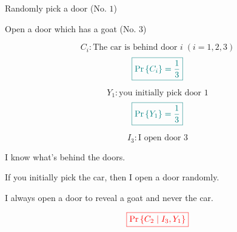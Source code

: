 
\begin{frame}{}
  \centerline{}

  \pause
  \vspace{-0.40cm}
  \begin{description}[(S)he]
    \centering
    \item[You:] Randomly pick a door (No. $1$)
    \item[I:] Open a door which has a goat (No. $3$) \\
  \end{description}

  \vspace{0.30cm}
  \centerline{}
\end{frame}

\begin{frame}{}
  \[
    C_i: \text{The car is behind door } i\; (i = 1, 2, 3)
  \]
  \[
    \textcolor{teal}{\boxed{\Pr\left\{C_i\right\} = \frac{1}{3}}}
  \]

  \pause
  \centerline{}

  \pause
  \vspace{0.50cm}
  \[
    Y_1: \text{you initially pick door } 1
  \]
  \[
    \textcolor{teal}{\boxed{\Pr\left\{Y_1\right\} = \frac{1}{3}}}
  \]

  \pause
  \centerline{}

\end{frame}

\begin{frame}{}
  \[
    I_3: \text{I open door } 3
  \]

  \vspace{0.50cm}
  \begin{description}
    \setlength{\itemsep}{8pt}
    \item<2->[\purple{\textsc{Assumption}:}]
      I know what's behind the doors.
    \item<3->[\purple{\textsc{Assumption}:}]
      If you initially pick the car, then I open a door randomly.
    \item<4->[\purple{\textsc{Assumption}:}]
      I always open a door to reveal a goat and never the car.
  \end{description}

  \pause
  \vspace{0.50cm}
  \[
    \textcolor{red}{\boxed{\Pr\left\{C_2 \mid I_3, Y_1\right\}}}
  \]
\end{frame}

